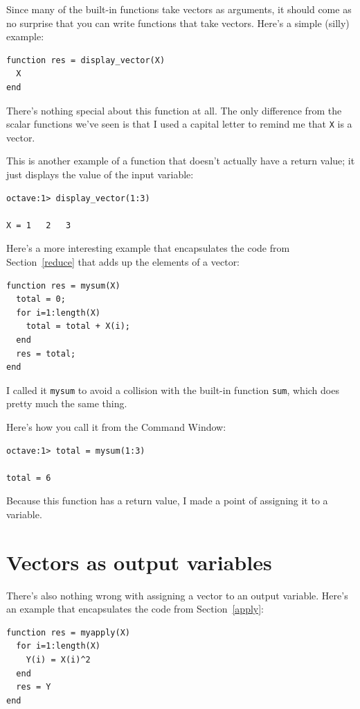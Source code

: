 \documentclass{book}
\begin{document}
Since many of the built-in functions take vectors as arguments,
it should come as no surprise that you can write functions that
take vectors. Here's a simple (silly) example:

\begin{verbatim}
function res = display_vector(X)
  X
end
\end{verbatim}

There's nothing special about this function at all. The only
difference from the scalar functions we've seen is that I used
a capital letter to remind me that {\tt X} is a vector.

This is another example of a function that doesn't actually have
a return value; it just displays the value of the input variable:

\begin{verbatim}
octave:1> display_vector(1:3)

X = 1   2   3
\end{verbatim}

Here's a more interesting example that encapsulates the code
from Section~\ref{reduce} that adds up the elements of a vector:

\begin{verbatim}
function res = mysum(X)
  total = 0;
  for i=1:length(X)
    total = total + X(i);
  end
  res = total;
end
\end{verbatim}

I called it {\tt mysum} to avoid a collision with the built-in
function {\tt sum}, which does pretty much the same thing.

Here's how you call it from the Command Window:

\begin{verbatim}
octave:1> total = mysum(1:3)

total = 6
\end{verbatim}

Because this function has a return value, I made a
point of assigning it to a variable.


\section{Vectors as output variables}

There's also nothing wrong with assigning a vector to an output
variable. Here's an example that encapsulates the code from
Section~\ref{apply}:

\begin{verbatim}
function res = myapply(X)
  for i=1:length(X)
    Y(i) = X(i)^2
  end
  res = Y
end
\end{verbatim}
\end{document}
